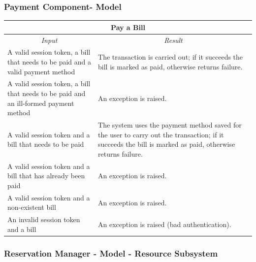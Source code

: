 \documentclass[english]{article}
\begin{document}
\newpage
\subsubsection{Payment Component- Model}

\begin{center}
	\begin{tabular}{ | p{6cm} | p{6cm} | }
		\hline 
		\multicolumn{2}{|c|}{\textbf{Pay a Bill}} \\
		\hline
		\multicolumn{1}{|c|}{\textit{Input}} & \multicolumn{1}{c|}{\textit{Result}} \\
		\hline
		A valid session token, a bill that needs to be paid and a valid payment method &  The transaction is carried out; if it succeeds the bill is marked as paid, otherwise returns failure. \\
		\hline
		A valid session token, a bill that needs to be paid and an ill-formed payment method & An exception is raised. \\
		\hline
		A valid session token and a bill that needs to be paid & The system uses the payment method saved for the user to carry out the transaction; if it succeeds the bill is marked as paid, otherwise returns failure. \\
		\hline
		A valid session token and a bill that has already been paid & An exception is raised. \\
		\hline
		A valid session token and a non-existent bill & An exception is raised. \\
		\hline
		An invalid session token and a bill & An exception is raised (bad authentication). \\
		\hline
	\end{tabular}
\end{center}

\newpage
\subsubsection{Reservation Manager - Model - Resource Subsystem}
\end{document}
